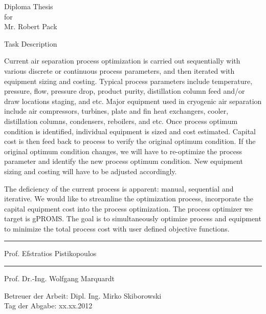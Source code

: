 \thispagestyle{plain}

\begin{center}
	\LARGE
	Diploma Thesis\\
	for\\
	Mr. Robert Pack\\
	\vspace{4ex}

	\vspace{3ex} Task Description
\end{center}

\normalsize

Current air separation process optimization is carried out sequentially with various discrete or continuous process parameters,
and then iterated with equipment sizing and costing. Typical process parameters include temperature, pressure, flow, pressure
drop, product purity, distillation column feed and/or draw locations staging, and etc. Major equipment used in cryogenic air
separation include air compressors, turbines, plate and fin heat exchangers, cooler, distillation columns, condensers, reboilers,
and etc. Once process optimum condition is identified, individual equipment is sized and cost estimated. Capital cost is then feed
back to process to verify the original optimum condition. If the original optimum condition changes, we will have to re-optimize
the process parameter and identify the new process optimum condition. New equipment sizing and costing will have to be
adjusted accordingly.

The deficiency of the current process is apparent: manual, sequential and iterative. We would like to streamline the optimization
process, incorporate the capital equipment cost into the process optimization. The process optimizer we target is gPROMS. The
goal is to simultaneously optimize process and equipment to minimize the total process cost with user defined objective functions.

 \vfill{
\begin{flushright}
	\begin{minipage}[r]{10cm}
		\begin{center}
			\hrule\vspace*{2ex}Prof. Efstratios Pistikopoulos\\
			\vspace{2cm}
			\hrule\vspace*{2ex}Prof. Dr.-Ing. Wolfgang Marquardt\\
			\vspace{1cm}
		\end{center}
	\end{minipage}
\end{flushright}
}

Betreuer der Arbeit: Dipl. Ing. Mirko Skiborowski\\
Tag der Abgabe: xx.xx.2012
\clearpage
